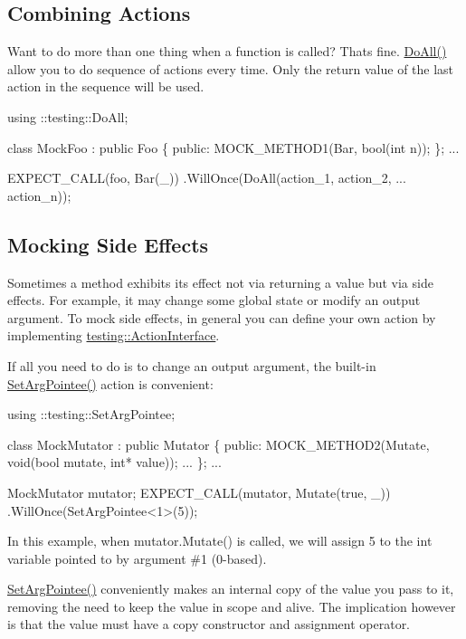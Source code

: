 \subsection*{Combining Actions}

Want to do more than one thing when a function is called? That\textquotesingle{}s fine. {\ttfamily \hyperlink{namespacetesting_a5f533932753d2af95000e96c4a3042e3}{Do\+All()}} allow you to do sequence of actions every time. Only the return value of the last action in the sequence will be used.


\begin{DoxyCode}
using ::testing::DoAll;

class MockFoo : public Foo \{
 public:
  MOCK\_METHOD1(Bar, bool(int n));
\};
...

  EXPECT\_CALL(foo, Bar(\_))
      .WillOnce(DoAll(action\_1,
                      action\_2,
                      ...
                      action\_n));
\end{DoxyCode}


\subsection*{Mocking Side Effects}

Sometimes a method exhibits its effect not via returning a value but via side effects. For example, it may change some global state or modify an output argument. To mock side effects, in general you can define your own action by implementing {\ttfamily \hyperlink{classtesting_1_1ActionInterface}{testing\+::\+Action\+Interface}}.

If all you need to do is to change an output argument, the built-\/in {\ttfamily \hyperlink{namespacetesting_a5740a5033b88c37666fcd09a269d123f}{Set\+Arg\+Pointee()}} action is convenient\+:


\begin{DoxyCode}
using ::testing::SetArgPointee;

class MockMutator : public Mutator \{
 public:
  MOCK\_METHOD2(Mutate, void(bool mutate, int* value));
  ...
\};
...

  MockMutator mutator;
  EXPECT\_CALL(mutator, Mutate(true, \_))
      .WillOnce(SetArgPointee<1>(5));
\end{DoxyCode}


In this example, when {\ttfamily mutator.\+Mutate()} is called, we will assign 5 to the {\ttfamily int} variable pointed to by argument \#1 (0-\/based).

{\ttfamily \hyperlink{namespacetesting_a5740a5033b88c37666fcd09a269d123f}{Set\+Arg\+Pointee()}} conveniently makes an internal copy of the value you pass to it, removing the need to keep the value in scope and alive. The implication however is that the value must have a copy constructor and assignment operator.

